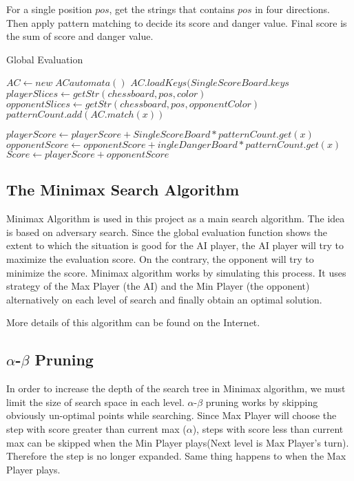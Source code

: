 \documentclass[conference]{IEEEtran}
\begin{document}
For a single position $pos$, get the strings that contains $pos$ in four directions. Then apply pattern matching to decide its score and danger value. Final score is the sum of score and danger value.
\begin{algorithm}
    \caption{Global Evaluation}
\begin{algorithmic}[1]
    \State $AC \gets new\; ACautomata()$
    \State $AC.loadKeys(SingleScoreBoard.keys$
    \State $playerSlices \gets getStr(chessboard, pos, color)$
    \State $opponentSlices \gets getStr(chessboard, pos, opponentColor)$
        \State $patternCount.add(AC.match(x))$
    \EndFor

        \State $playerScore \gets playerScore + SingleScoreBoard*patternCount.get(x)$
        \Else
        \State $opponentScore \gets opponentScore + ingleDangerBoard*patternCount.get(x)$
        \EndIf
    \EndFor
    \State $Score \gets playerScore + opponentScore$
\end{algorithmic}
\end{algorithm}
\subsection{The Minimax Search Algorithm}
Minimax Algorithm is used in this project as a main search algorithm. The idea is based on adversary search. Since the global evaluation function shows the extent to which the situation is good for the AI player, the AI player will try to maximize the evaluation score. On the contrary, the opponent will try to minimize the score. Minimax algorithm works by simulating this process. It uses strategy of the Max Player (the AI) and the Min Player (the opponent) alternatively on each level of search and finally obtain an optimal solution.

More details of this algorithm can be found on the Internet. 

\subsection{$\alpha$-$\beta$ Pruning}
In order to increase the depth of the search tree in Minimax algorithm, we must limit the size of search space in each level. $\alpha$-$\beta$ pruning works by skipping obviously un-optimal points while searching. Since Max Player will choose the step with score greater than current max ($\alpha$), steps with score less than current max can be skipped when the Min Player plays(Next level is Max Player's turn). Therefore the step is no longer expanded. Same thing happens to when the Max Player plays.
\end{document}
